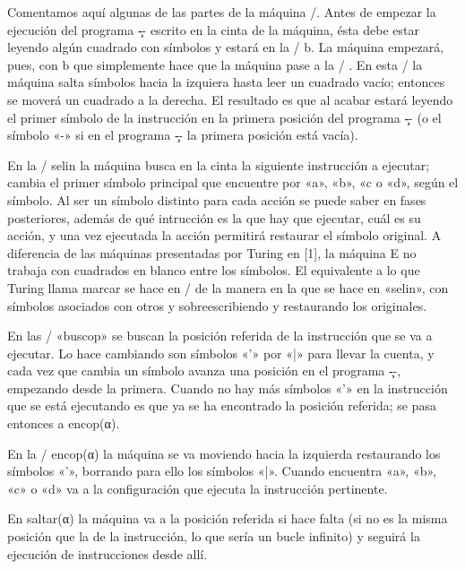  Comentamos aquí algunas de las partes de la máquina \E/. Antes de empezar
la ejecución del programa \c-- escrito en la cinta de la máquina, ésta debe estar leyendo algún
cuadrado con símbolos y estará en la \configuration/ {\ffraktur b}. La máquina empezará, pues, con
\encaje
{\mconfig b}    {}%
\finencaje
que simplemente hace que la máquina pase a la \configuration/ {}. En
esta \configuration/ la máquina salta símbolos hacia la izquiera hasta leer un cuadrado vacío;
entonces se moverá un cuadrado a la derecha. El resultado es que al acabar estará leyendo el primer
símbolo de la instrucción en la primera posición del programa \c-- (o el símbolo «-» si en el
programa \c-- la primera posición está vacía).

En la \configuration/ {\ffraktur selin} la máquina busca en la cinta la siguiente instrucción a
ejecutar; cambia el primer símbolo principal que encuentre por «a», «b», «c o «d», según el
símbolo. Al ser un símbolo distinto para cada acción se puede saber en fases posteriores, además de
qué intrucción es la que hay que ejecutar, cuál es su acción, y una vez ejecutada la acción
permitirá restaurar el símbolo original. A diferencia de las máquinas presentadas por Turing en [1],
la máquina {\machine E} no trabaja con cuadrados en blanco entre los símbolos. El equivalente a lo
que Turing llama marcar se hace en \E/ de la manera en la que se hace en «{\ffraktur selin}», con
símbolos asociados con otros y sobreescribiendo y restaurando los originales.

En las \configuration/ «{\ffraktur buscop}» se buscan la posición referida de la instrucción que se va
a ejecutar. Lo hace cambiando son símbolos «'» por «|» para llevar la cuenta, y cada vez que cambia
un símbolo avanza una posición en el programa \c--, empezando desde la primera. Cuando no hay más
símbolos «'» en la instrucción que se está ejecutando es que ya se ha encontrado la posición
referida; se pasa entonces a {\ffraktur encop({\fcode α})}.

En la \configuration/ {\ffraktur encop({\fcode α})} la máquina se va moviendo hacia la izquierda
restaurando los símbolos «'», borrando para ello los símbolos «|». Cuando encuentra «a», «b», «c» o
«d» va a la configuración que ejecuta la instrucción pertinente.

En {\ffraktur saltar({\fcode α})} la máquina va a la posición referida si hace falta (si no es la
misma posición que la de la instrucción, lo que sería un bucle infinito) y seguirá la ejecución de
instrucciones desde allí.

